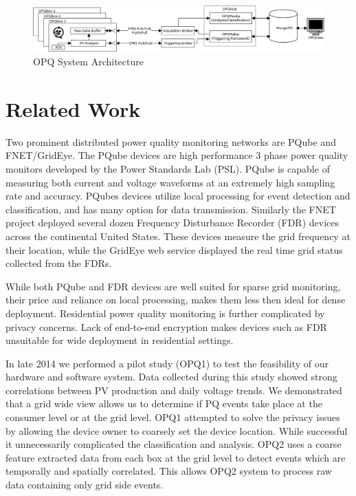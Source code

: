 \documentclass[a4paper, conference]{IEEEtran}
\begin{document}
\begin{figure}[htb!]\label{fig:system-architecture}
    \centering
    \includegraphics[width=0.9\linewidth]{img/system-diagram}
    \caption{OPQ System Architecture}
\end{figure}

\section{Related Work}

Two prominent distributed power quality monitoring networks are PQube and FNET/GridEye. The PQube devices are high performance 3 phase power quality monitors developed by the Power Standards Lab (PSL). PQube is capable of measuring both current and voltage waveforms at an extremely high sampling rate and accuracy. PQubes devices utilize local processing for event detection and classification, and has many option for data transmission. Similarly the FNET project deployed several dozen Frequency Disturbance Recorder (FDR) devices across the continental United States. These devices measure the grid frequency at their location, while the GridEye web service displayed the real time grid status collected from the FDRs.

While both PQube and FDR devices are well suited for sparse grid monitoring, their price and reliance on local processing, makes them less then ideal for dense deployment. Residential power quality monitoring is further complicated by privacy concerns. Lack of end-to-end encryption makes devices such as FDR unsuitable for wide deployment in residential settings. 

In late 2014 we performed a pilot study (OPQ1) to test the feasibility of our hardware and software system. Data collected during this study showed strong correlations between PV production and daily voltage trends. We demonstrated that a grid wide view allows us to determine if PQ events take place at the consumer level or at the grid level. OPQ1 attempted to solve the privacy issues by allowing the device owner to coarsely set the device location. While successful it unnecessarily complicated the classification and analysis. OPQ2 uses a coarse feature extracted data from each box at the grid level to detect events which are temporally and spatially correlated. This allows OPQ2 system to process raw data containing only grid side events. 
\end{document}
